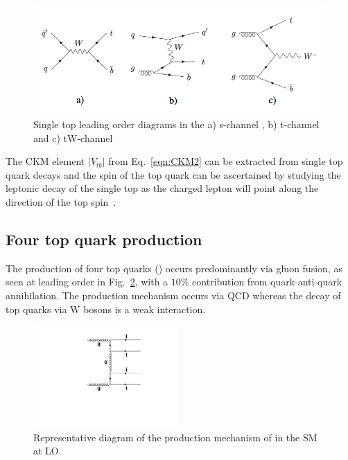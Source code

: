 \begin{figure}[ht!]
\begin{center}
    \includegraphics[width=\textwidth]{images/Theory/stFeyn.png}
    \caption{Single top leading order diagrams in the a) s-channel , b) t-channel and c) tW-channel~\cite{Lannon:2012fp}}
    \label{fig:stFeyn}
\end{center}
\end{figure}

The CKM element $|V_{tb}|$ from Eq.~\ref{eqn:CKM2} can be extracted from single top quark decays and the spin of the top quark can be ascertained by studying the leptonic decay of the single top as the charged lepton will point along the direction of the top spin~\cite{Boos:2012hi}.

\subsection{Four top quark production}

The production of four top quarks (\tttt) occurs predominantly via gluon fusion, as seen at leading order in Fig.~\ref{fig:ttttAtLO}, with a $10\%$ contribution from quark-anti-quark annihilation. The production mechanism occurs via QCD whereas the decay of top quarks via W bosons is a weak interaction. 

\begin{figure}[ht!]
\begin{center}
    \includegraphics[width=0.49\textwidth]{images/Theory/tttt_t_LO.pdf}
    \caption{Representative diagram of the production mechanism of \tttt in the SM at LO.}
    \label{fig:ttttAtLO}
\end{center}
\end{figure}

